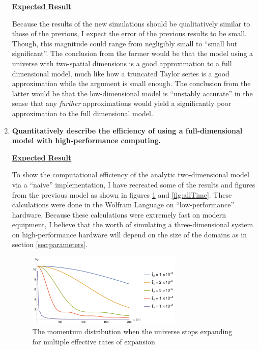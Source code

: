 \documentclass{article}
\begin{document}
\begin{enumerate}
                \underline{\textbf{Expected Result}}

                Because the results of the new simulations should be qualitatively similar to those of the previous, I expect the error of the previous results to be small.  Though, this magnitude could range from negligibly small to ``small but significant''.  The conclusion from the former would be that the model using a universe with two-spatial dimensions is a good approximation to a full dimensional model, much like how a truncated Taylor series is a good approximation while the argument is small enough.  The conclusion from the latter would be that the low-dimensional model is ``unstably accurate'' in the sense that any \emph{further} approximations would yield a significantly poor approximation to the full dimensional model.
                
            \item \textbf{Quantitatively describe the efficiency of using a full-dimensional model with high-performance computing.}

                \underline{\textbf{Expected Result}}

                To show the computational efficiency of the analytic two-dimensional model via a ``naive'' implementation, I have recreated some of the results and figures from the previous model\cite{Jain} as shown in figures \ref{fig:finalTime} and \ref{fig:allTime}.  These calculations were done in the Wolfram Language on ``low-performance'' hardware.  Because these calculations were extremely fast on modern equipment, I believe that the worth of simulating a three-dimensional system on high-performance hardware will depend on the size of the domains as in section \ref{sec:parameters}.

                \begin{figure}[h]
                    \centering
                    \includegraphics[width = 0.7\textwidth]{fig2.png}
                    \caption{The momentum distribution when the universe stops expanding for multiple effective rates of expansion}
                    \label{fig:finalTime}
                \end{figure}


\end{enumerate}
\end{document}
